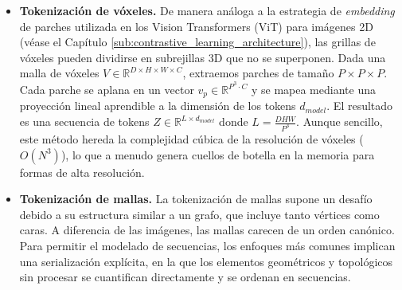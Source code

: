 \documentclass[../../book-main_es.tex]{subfiles}
\begin{document}
\begin{itemize}
\item \textbf{Tokenización de vóxeles.} 
De manera análoga a la estrategia de \textit{embedding} de parches utilizada en los Vision Transformers 
(ViT) para imágenes 2D (véase el Capítulo \ref{sub:contrastive_learning_architecture}), las grillas 
de vóxeles pueden dividirse en subrejillas 3D que no se superponen. Dada una malla de vóxeles 
$V \in \mathbb{R}^{D \times H \times W \times C}$, extraemos parches de tamaño $P \times P \times P$. 
Cada parche se aplana en un vector $v_p \in \mathbb{R}^{P^3 \cdot C}$ y se mapea mediante una 
proyección lineal aprendible a la dimensión de los tokens $d_{model}$. El resultado es una secuencia 
de tokens $Z \in \mathbb{R}^{L \times d_{model}}$ donde $L = \frac{DHW}{P^3}$. Aunque sencillo, este 
método hereda la complejidad cúbica de la resolución de vóxeles ($O(N^3)$), lo que a menudo genera 
cuellos de botella en la memoria para formas de alta resolución.

    
    

\item \textbf{Tokenización de mallas.} 
La tokenización de mallas supone un desafío debido a su estructura similar a un grafo, 
que incluye tanto vértices como caras.  A diferencia de las imágenes, las mallas carecen 
de un orden canónico. Para permitir el modelado de secuencias, los enfoques más comunes implican
una serialización explícita, en la que los elementos geométricos y topológicos sin procesar 
se cuantifican directamente y se ordenan en secuencias.


\end{itemize}
\end{document}
